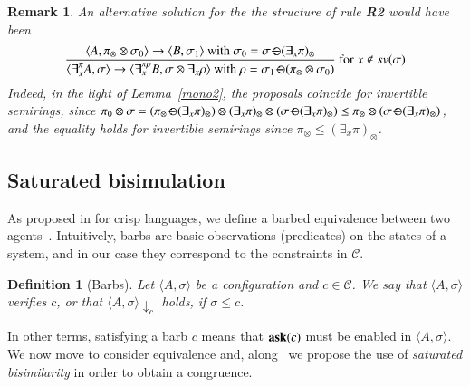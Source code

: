 \documentclass[preprint,12pt]{elsarticle}
\newtheorem{definition}{Definition}
\newtheorem{remark}{Remark}
\newcommand{\ask}{{\bf ask}}
\def\odiv{\, {\ominus\hspace{-7.7pt} \div} \,}
\begin{document}
\begin{remark}
	An alternative solution for the the structure of rule \mbox{\bf R2} would have been
	$$\frac {\displaystyle \langle A, \pi_\otimes \otimes \sigma_0 \rangle
		\to \langle B, \sigma_1 \rangle \text{ with } \sigma_0 = \sigma \odiv (\exists_x \pi)_\otimes}
	{\displaystyle\langle \exists^{\pi}_x A,\sigma\rangle \to \langle 
		\exists^{\pi \rho}_x B, \sigma \otimes \exists_x \rho
		\rangle \text{ with } \rho = \sigma_1 \odiv (\pi_\otimes \otimes \sigma_0)} \text{ for } x \not \in sv(\sigma)$$
	Indeed, in the light of Lemma~\ref{mono2}, the proposals coincide for 
	invertible semirings, since 
	$\pi_0 \otimes \sigma
	=
	(\pi_\otimes \odiv (\exists_x \pi)_\otimes) \otimes (\exists_x \pi)_\otimes \otimes (\sigma \odiv (\exists_x \pi)_\otimes)
	\leq
	\pi_\otimes \otimes (\sigma \odiv (\exists_x \pi)_\otimes)$,
	and the equality holds for invertible semirings
	since $\pi_\otimes \leq (\exists_x \pi)_\otimes$.
\end{remark}




\subsection{Saturated bisimulation}\label{sec:saturated}
As proposed in \cite{pippo} for crisp languages, we define a barbed equivalence between two agents~\cite{barbed}.  
%
Intuitively, barbs are basic observations (predicates) on the states of a system, and in our case they correspond 
to the constraints in $\mathcal{C}$.

\begin{definition} [Barbs]
	Let $\langle A, \sigma \rangle$ be a configuration and $c \in \mathcal{C}$. We say that $\langle A, \sigma \rangle$ verifies $c$, or that $\langle A, \sigma \rangle \downarrow_c$ holds, if  $\sigma \leq c$.
\end{definition}

In other terms, satisfying a barb $c$ means that $\hbox{\ask}(c)$ must be enabled in $\langle A, \sigma \rangle$.
%
We now move to consider equivalence and, %
along~\cite{pippo}
we propose the use of \emph{saturated bisimilarity}
in order to obtain a congruence.
%
\end{document}
